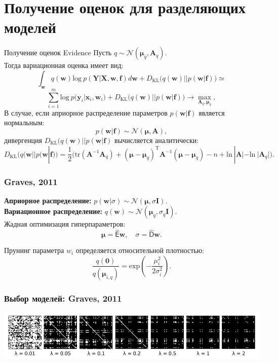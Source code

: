 \documentclass[10pt,pdf,utf8,russian,aspectratio=169]{beamer}
\begin{document}
\section{Получение оценок для разделяющих моделей}
\begin{frame}{Получение оценок Evidence}
Пусть $q \sim \mathcal{N}(\boldsymbol{\mu}_q, \mathbf{A}_q).$\\
Тогда вариационная оценка имеет вид:
$$
\int_{\mathbf{w}} q(\mathbf{w})\text{log}~{p(\mathbf{Y}|\mathbf{X},\mathbf{w},\mathbf{f})} d \mathbf{w} + D_\text{KL}\bigl(q (\mathbf{w} )|| p (\mathbf{w}|\mathbf{f})\bigr) \simeq
$$
$$
\sum_{i=1}^m \text{log}~p(\mathbf{y}_i|\mathbf{x}_i, \mathbf{w}_i) + D_\text{KL}\bigl(q (\mathbf{w} )|| p (\mathbf{w}|\mathbf{f})\bigr) \to \max_{\mathbf{A}_q, \boldsymbol{\mu}_q},
$$
В случае, если априорное распределение параметров $p(\mathbf{w}|\mathbf{f})$ является нормальным: 
$$
p(\mathbf{w}|\mathbf{f}) \sim \mathcal{N}(\boldsymbol{\mu}, \mathbf{A}),
$$
дивергенция $D_\text{KL}\bigl(q (\mathbf{w} )|| p (\mathbf{w}|\mathbf{f})$ вычисляется аналитически:
$$
D_\text{KL}\bigl(q (\mathbf{w} || p (\mathbf{w}|\mathbf{f})\bigr) = \frac{1}{2} \bigl( \text{tr} (\mathbf{A}^{-1}\mathbf{A}_q) + (\boldsymbol{\mu} - \boldsymbol{\mu}_q)^\text{T}\mathbf{A}^{-1}(\boldsymbol{\mu} - \boldsymbol{\mu}_q) - n +\text{ln}~|\mathbf{A}| - \text{ln}~|\mathbf{A}_q| \bigr).
$$
\end{frame}


\begin{frame}
\frametitle{ Graves, 2011}


\textbf{Априорное распределение:} $p(\mathbf{w}|\sigma) \sim \mathcal{N}(\boldsymbol{\mu}, \sigma \mathbf{I}).$\\
\textbf{Вариационное распределение:} $q (\mathbf{w}) \sim \mathcal{N}(\boldsymbol{\mu}_q, \sigma_q \mathbf{I}).$\\
Жадная оптимизация гиперпараметров:
\[
	\boldsymbol{\mu} = \hat{\mathsf{E}} \mathbf{w},
\quad
	\sigma = \hat{\mathsf{D}} \mathbf{w}.
\]

Прунинг параметра ${w}_i$ определяется относительной плотностью:
\[
	\frac{q(\mathbf{0})}{q(\boldsymbol{\mu}_{i,q})}  = \text{exp}(-\frac{\mu_i^2}{2\sigma_i^2}).
\]
\end{frame}



\begin{frame}
\frametitle{Выбор моделей: Graves, 2011}
\includegraphics[width=\textwidth]{graves.png}
\end{frame}
\end{document}
